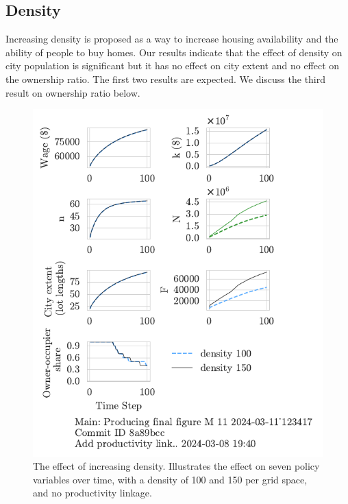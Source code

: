 \subsection{Density}
Increasing density is proposed as a way to increase housing availability and the ability of people to buy homes. Our results indicate that the effect of density on city population is significant but it has no effect on city extent and no effect on the ownership ratio. The first two results are expected. We discuss the third result on ownership ratio below.


\begin{figure}[h!bt]
    \centering
    \includegraphics[scale=1, trim={0 1.4cm 0 0},clip]{fig/density-Main-123417.pdf}
    \caption[The effect of increasing density]{The effect of increasing density. Illustrates the effect on seven policy variables over time, with a density of 100 and 150 per grid space, and no productivity linkage.}
    \label{fig:density_ownership_trajectory}
\end{figure}


